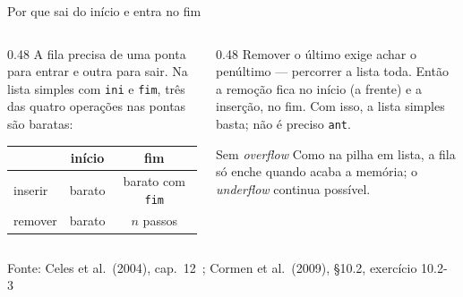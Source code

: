 \documentclass[aspectratio=169]{beamer}
\newcommand{\fonte}[1]{\vfill\hfill{\scriptsize\textcolor{UFSGray}{Fonte: #1}}}
\begin{document}
\begin{frame}{Por que sai do início e entra no fim}
  \begin{columns}[T]
    \begin{column}{0.48\textwidth}
      \small
      A fila precisa de uma ponta para entrar e outra para sair. Na lista
      simples com \texttt{ini} e \texttt{fim}, três das quatro operações nas
      pontas são baratas:

      \medskip
      \begin{tabular}{@{}lcc@{}}
        & início & fim\\
        \midrule
        inserir & barato & barato com \texttt{fim}\\
        remover & barato & $n$ passos\\
      \end{tabular}
    \end{column}
    \begin{column}{0.48\textwidth}
      \small Remover o último exige achar o penúltimo --- percorrer a lista
      toda. Então a remoção fica no início (a frente) e a inserção, no fim.
      Com isso, a lista simples basta; não é preciso \texttt{ant}.

      \begin{block}{Sem \emph{overflow}}
        \small Como na pilha em lista, a fila só enche quando acaba a
        memória; o \emph{underflow} continua possível.
      \end{block}
    \end{column}
  \end{columns}
  \fonte{Celes et al.\ (2004), cap.~12~\cite{celes2004introducao};
    Cormen et al.\ (2009), §10.2, exercício 10.2-3~\cite{cormen2009introduction}}
\end{frame}
\end{document}
